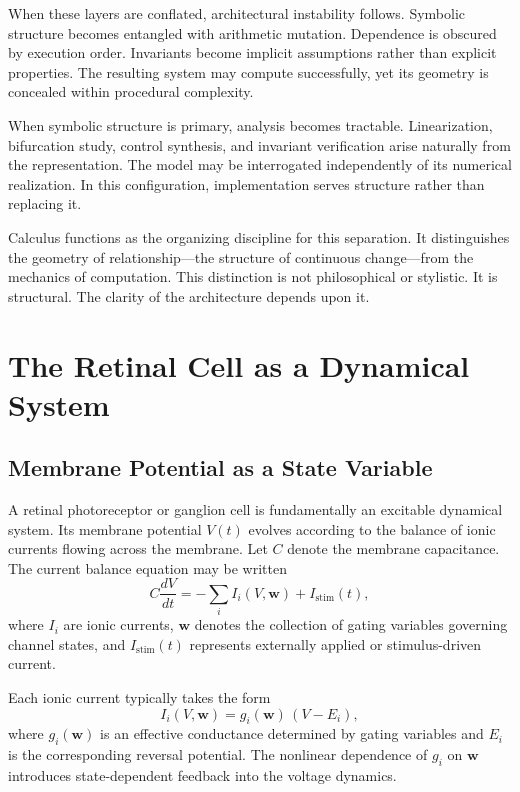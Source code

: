 \documentclass[12pt]{book}
\begin{document}
When these layers are conflated, architectural instability follows.
Symbolic structure becomes entangled with arithmetic mutation.
Dependence is obscured by execution order. Invariants become implicit
assumptions rather than explicit properties. The resulting system may
compute successfully, yet its geometry is concealed within procedural
complexity.

When symbolic structure is primary, analysis becomes tractable.
Linearization, bifurcation study, control synthesis, and invariant
verification arise naturally from the representation. The model may be
interrogated independently of its numerical realization. In this
configuration, implementation serves structure rather than replacing it.

Calculus functions as the organizing discipline for this separation.
It distinguishes the geometry of relationship---the structure of
continuous change---from the mechanics of computation. This
distinction is not philosophical or stylistic. It is structural.
The clarity of the architecture depends upon it.

\chapter{The Retinal Cell as a Dynamical System} 

\section{Membrane Potential as a State Variable}

A retinal photoreceptor or ganglion cell is fundamentally an excitable
dynamical system. Its membrane potential $V(t)$ evolves according to
the balance of ionic currents flowing across the membrane. Let $C$
denote the membrane capacitance. The current balance equation may be
written
\[
C \frac{dV}{dt}
=
- \sum_{i} I_i(V, \mathbf{w})
+
I_{\mathrm{stim}}(t),
\]
where $I_i$ are ionic currents, $\mathbf{w}$ denotes the collection of
gating variables governing channel states, and
$I_{\mathrm{stim}}(t)$ represents externally applied or stimulus-driven
current.

Each ionic current typically takes the form
\[
I_i(V, \mathbf{w})
=
g_i(\mathbf{w})\,(V - E_i),
\]
where $g_i(\mathbf{w})$ is an effective conductance determined by
gating variables and $E_i$ is the corresponding reversal potential.
The nonlinear dependence of $g_i$ on $\mathbf{w}$ introduces
state-dependent feedback into the voltage dynamics.
\end{document}
